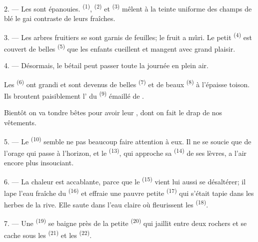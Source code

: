 2. --- Les  sont épanouies. 
\textsuperscript{(1)},  \textsuperscript{(2)} et
 \textsuperscript{(3)} mêlent à la teinte uniforme des champs
de blé le gai contraste de leurs  fraîches.

3. --- Les arbres fruitiers se sont garnis de feuilles; le fruit a mûri. Le
petit  \textsuperscript{(4)} est couvert de belles
 \textsuperscript{(5)} que les enfants cueillent et mangent avec
grand plaisir.

4. --- Désormais, le bétail peut passer toute la journée en plein air.

Les  \textsuperscript{(6)} ont grandi et sont devenus de belles
 \textsuperscript{(7)} et de beaux 
\textsuperscript{(8)} à l'épaisse toison. Ils broutent paisiblement
l' du  \textsuperscript{(9)} émaillé de
.

Bientôt on va tondre  bêtes pour avoir leur , dont on
fait le drap de nos vêtements.

\VUsaut{5.0mm}
\VUsaut{3.4mm}

5. --- Le  \textsuperscript{(10)} semble ne pas beaucoup faire
attention à eux. Il ne se soucie que de l'orage qui passe à l'horizon, et le
 \textsuperscript{(13)}, qui approche sa
 \textsuperscript{(14)} de ses lèvres, a l'air encore plus
insouciant.

6. --- La chaleur est accablante, parce que le 
\textsuperscript{(15)} vient lui aussi se désaltérer; il lape l'eau fraîche du
 \textsuperscript{(16)} et effraie une pauvre petite
 \textsuperscript{(17)} qui s'était tapie dans les herbes de
la rive. Elle saute dans l'eau claire où fleurissent les 
\textsuperscript{(18)}.

7. --- Une  \textsuperscript{(19)} se baigne près de la
petite  \textsuperscript{(20)} qui jaillit entre deux rochers et
se cache sous les  \textsuperscript{(21)} et les
 \textsuperscript{(22)}.

\VUsaut{5.0mm}
\VUsaut{3.4mm}

